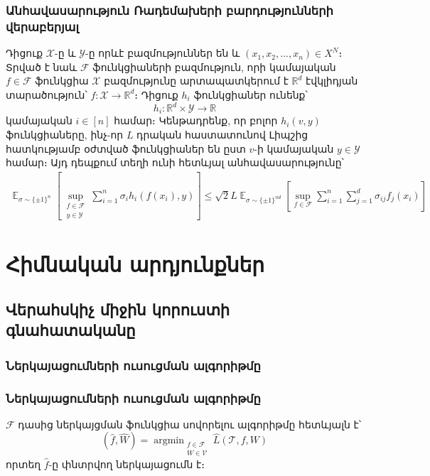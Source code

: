 \documentclass[10pt]{beamer}
\DeclareMathOperator*{\argmin}{argmin}
\DeclareMathOperator*{\E}{\mathbb{E}}
\begin{document}
\begin{frame}
\frametitle{\armfont Անհավասարություն Ռադեմախերի բարդությունների վերաբերյալ}
 \fontsize{8pt}{8pt} 
\begin{exampleblock}{} \armfont
Դիցուք $\mathcal{X}$-ը և $\mathcal{Y}$-ը որևէ բազմություններ են  և $(x_1, x_2, ..., x_n) \in X^N$։ Տրված է նաև $\mathcal{F}$ ֆունկցիաների բազմություն, որի կամայական $f \in \mathcal{F}$ ֆունկցիա $\mathcal{X}$ բազմությունը արտապատկերում է $\mathbb{R}^d$ էվկլիդյան տարածություն՝ $f:\mathcal{X} \rightarrow \mathbb{R}^d$։ Դիցուք $h_i$ ֆունկցիաներ ունենք՝ $$h_i:\mathbb{R}^d \times \mathcal{Y} \rightarrow \mathbb{R}$$ կամայական $i \in [n]$ համար։ Կենթադրենք, որ բոլոր $h_i(v, y)$ ֆունկցիաները, ինչ-որ $L$ դրական հաստատունով Լիպշից հատկությամբ օժտված ֆունկցիաներ են ըստ $v$-ի կամայական $y \in \mathcal{Y}$ համար։ Այդ դեպքում տեղի ունի հետևյալ անհավասարությունը՝
\begin{align*}
\E_{\sigma \sim \{\pm 1\}^n}\left[\sup_{\substack{f \in \mathcal{F} \\ y \in \mathcal{Y}} }  \sum_{i=1}^n{\sigma_ih_i(f(x_i), y)}  \right]    \leq \sqrt{2}L \E_{\sigma \sim \{\pm1\}^{nd}} \left[  \sup_{f \in \mathcal{F}}  \sum_{i=1}^n\sum_{j=1}^d{\sigma_{ij}f_j(x_i)}   \right]
\end{align*}
\end{exampleblock}
\end{frame}


\section{\armfont Հիմնական արդյունքներ}

\subsection{\armfont Վերահսկիչ միջին կորուստի գնահատականը}

\begin{frame}
\frametitle{\armfont Ներկայացումների ուսուցման ալգորիթմը}
\end{frame}

\begin{frame}
\frametitle{\armfont Ներկայացումների ուսուցման ալգորիթմը}\armfont
$\mathcal{F}$ դասից  ներկայցման ֆունկցիա սովորելու ալգորիթմը հետևյալն է՝
$$(\hat{f}, \hat{W}) = \argmin_{\substack{f \in \mathcal{F} \\ W \in \mathcal{V}}} \hat{L}(\mathcal{T},f, W)$$
որտեղ $\hat{f}$-ը փնտրվող ներկայացումն է։
\end{frame}
\end{document}
